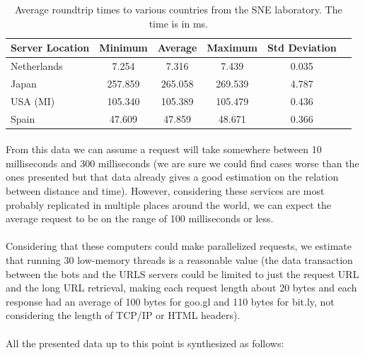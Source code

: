 \documentclass[12pt]{article}
\begin{document}
\begin{table}[h]
	
		\begin{tabular}{|l|c|c|c|c|c|}
  			\hline
	  		\textbf{Server Location} & \textbf{Minimum} & \textbf{Average} & \textbf{Maximum} & \textbf{Std Deviation} \\
	  		\hline
  			Netherlands & 7.254 & 7.316 & 7.439 & 0.035 \\ 
  			\hline
  			Japan & 257.859 & 265.058 & 269.539 & 4.787 \\
	  		\hline
  			USA (MI) & 105.340 & 105.389 & 105.479 & 0.436 \\
  			\hline
  			Spain & 47.609 & 47.859 & 48.671 & 0.366 \\
  			\hline
		\end{tabular}
	\caption[A table]{Average roundtrip times to various countries from the SNE laboratory. The time is in ms.}
\end{table}

\paragraph{}
From this data we can assume a request will take somewhere between 10 milliseconds and 300 milliseconds (we are sure we could find cases worse than the ones presented but that data already gives a good estimation on the relation between distance and time). However, considering these services are most probably replicated in multiple places around the world, we can expect the average request to be on the range of 100 milliseconds or less.

\paragraph{}
Considering that these computers could make parallelized requests, we estimate that running 30 low-memory threads is a reasonable value (the data transaction between the bots and the URLS servers could be limited to just the request URL and the long URL retrieval, making each request length about 20 bytes and each response had an average of 100 bytes for goo.gl and 110 bytes for bit.ly, not considering the length of TCP/IP or HTML headers).

\paragraph{}
All the presented data up to this point is synthesized as follows:
\end{document}
